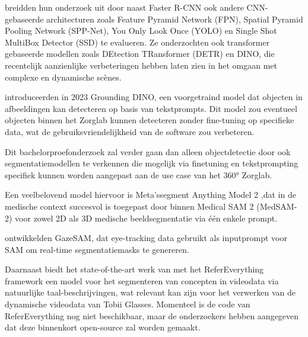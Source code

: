 \textcite{Cederin2023} breidden hun onderzoek uit door 
naast Faster R-CNN ook andere CNN-gebaseerde architecturen zoals Feature Pyramid Network (FPN), Spatial Pyramid Pooling Network (SPP-Net), 
You Only Look Once (YOLO) en Single Shot MultiBox Detector (SSD) te evalueren. 
Ze onderzochten ook transformer gebaseerde modellen zoals DEtection TRansformer (DETR) en DINO, 
die recentelijk aanzienlijke verbeteringen hebben laten zien in het omgaan met complexe en dynamische scènes.
\par
\textcite{Liu2023} introduceerden in 2023 Grounding DINO, een voorgetraind model dat objecten in afbeeldingen kan detecteren op basis van tekstprompts.
Dit model zou eventueel objecten binnen het Zorglab kunnen detecteren zonder fine-tuning op specifieke data, wat de gebruiksvriendelijkheid van de software zou verbeteren.
\par
Dit bachelorproefonderzoek zal verder gaan dan alleen objectdetectie door ook segmentatiemodellen te verkennen 
die mogelijk via finetuning en tekstprompting specifiek kunnen worden aangepast aan de use case van het 360° Zorglab. 

Een veelbelovend model hiervoor is Meta’s\newline segment Anything Model 2 \autocite{Ravi2024},\newline dat in de medische context succesvol is toegepast door \textcite{Zhu2024}
binnen Medical SAM 2 (MedSAM-2) voor zowel 2D als 3D medische beeldsegmentatie via één enkele prompt. 

\textcite{Wang2023} ontwikkelden GazeSAM, dat eye-tracking 
data gebruikt als inputprompt voor SAM om real-time segmentatiemasks te genereren.

Daarnaast biedt het state-of-the-art werk van \textcite{Bagchi2024} met het ReferEverything framework een model voor het segmenteren van concepten in 
videodata via natuurlijke taal-\newline beschrijvingen, wat relevant kan zijn voor het verwerken van de dynamische videodata van Tobii Glasses.
Momenteel is de code van ReferEverything nog niet beschikbaar, maar de onderzoekers hebben aangegeven dat deze binnenkort open-source zal worden gemaakt.


